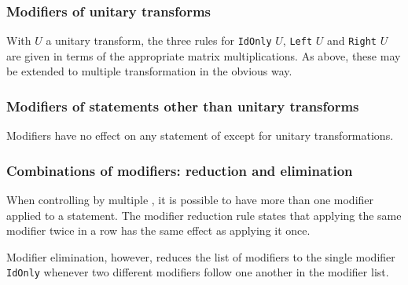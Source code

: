 \subsubsection{Modifiers of unitary transforms}
With $U$ a unitary transform, the three rules for \texttt{IdOnly} $U$,
\texttt{Left} $U$ and \texttt{Right} $U$ are given in
terms of the appropriate matrix multiplications. As above, these may
be extended to multiple \qbit{} transformation in the obvious way.

\subsubsection{Modifiers of statements other than unitary transforms}
Modifiers have no effect on any statement of \lqpl{} except for
unitary transformations.

\subsubsection{Combinations of modifiers: reduction and elimination}
When controlling by multiple \qbits, it is possible to have more than
one modifier applied to a statement. The modifier reduction rule 
states that applying the same modifier twice in a row has the same
effect as applying it once.

Modifier elimination, however, reduces the list of modifiers to 
the single modifier \texttt{IdOnly}
whenever  two different modifiers follow one another in the modifier list.









